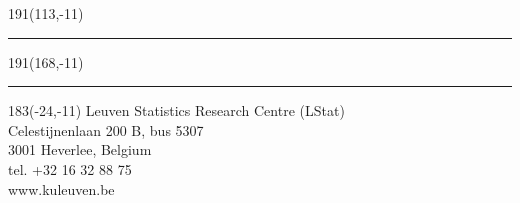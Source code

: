 \documentclass[12pt,a4paper,oneside]{book}
\begin{document}




\newpage
\setcounter{page}{0}



\newpage
\thispagestyle{empty}
\sffamily
%
\begin{textblock}{191}(113,-11)
{\color{blueline}\rule{160pt}{5.5pt}}
\end{textblock}
%
\begin{textblock}{191}(168,-11)
{\color{blueline}\rule{5.5pt}{59pt}}
\end{textblock}
%
\begin{textblock}{183}(-24,-11)
\textblockcolour{}
\flushright
\fontsize{7}{7.5}\selectfont
Leuven Statistics Research Centre (LStat) \\
Celestijnenlaan 200 B, bus 5307 \\
3001 Heverlee, Belgium\\
tel. +32 16 32 88 75 \\
www.kuleuven.be\\
\end{textblock}
%
\end{document}
